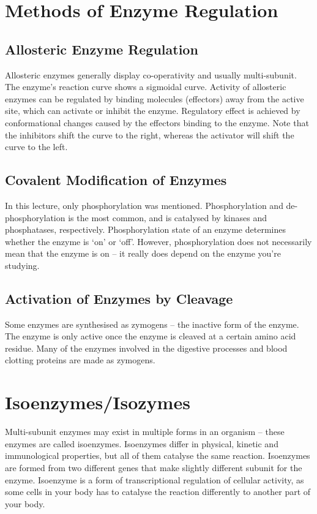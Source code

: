 \section{Methods of Enzyme Regulation}

\subsection{Allosteric Enzyme Regulation}

\begin{center}
\end{center}

Allosteric enzymes generally display co-operativity and usually multi-subunit.
The enzyme's reaction curve shows a sigmoidal curve.
Activity of allosteric enzymes can be regulated by binding molecules (effectors) away from the active site, which can activate or inhibit the enzyme.
Regulatory effect is achieved by conformational changes caused by the effectors binding to the enzyme.
Note that the inhibitors shift the curve to the right, whereas the activator will shift the curve to the left.

\subsection{Covalent Modification of Enzymes}

In this lecture, only phosphorylation was mentioned.
Phosphorylation and de-phosphorylation is the most common, and is catalysed by kinases and phosphatases, respectively.
Phosphorylation state of an enzyme determines whether the enzyme is `on' or `off'.
However, phosphorylation does not necessarily mean that the enzyme is on -- it really does depend on the enzyme you're studying.

\subsection{Activation of Enzymes by Cleavage}

Some enzymes are synthesised as zymogens -- the inactive form of the enzyme.
The enzyme is only active once the enzyme is cleaved at a certain amino acid residue.
Many of the enzymes involved in the digestive processes and blood clotting proteins are made as zymogens.

\section{Isoenzymes/Isozymes}

Multi-subunit enzymes may exist in multiple forms in an organism -- these enzymes are called isoenzymes.
Isoenzymes differ in physical, kinetic and immunological properties, but all of them catalyse the same reaction.
Isoenzymes are formed from two different genes that make slightly different subunit for the enzyme.
Isoenzyme is a form of transcriptional regulation of cellular activity, as some cells in your body has to catalyse the reaction differently to another part of your body.
